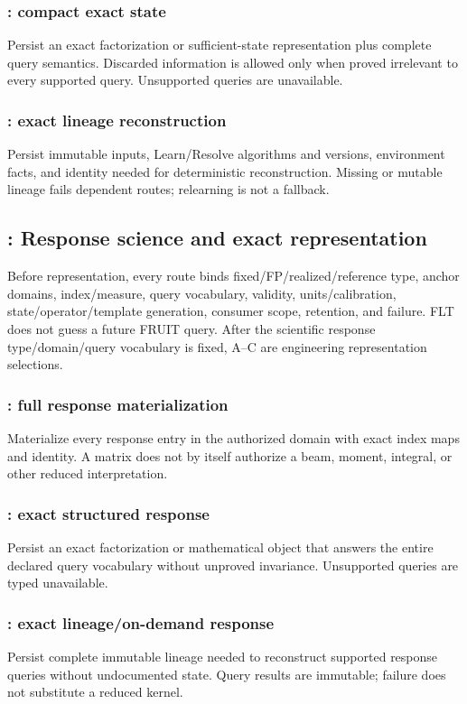 \subsubsection{: compact exact state}
Persist an exact factorization or sufficient-state representation plus complete
query semantics. Discarded information is allowed only when proved irrelevant
to every supported query. Unsupported queries are unavailable.

\subsubsection{: exact lineage reconstruction}
Persist immutable inputs, Learn/Resolve algorithms and versions, environment
facts, and identity needed for deterministic reconstruction. Missing or mutable
lineage fails dependent routes; relearning is not a fallback.

\subsection{: Response science and exact representation}

Before representation, every route binds fixed/FP/realized/reference type,
anchor domains, index/measure, query vocabulary, validity, units/calibration,
state/operator/template generation, consumer scope, retention, and failure.
FLT does not guess a future FRUIT query.
After the scientific response type/domain/query vocabulary is fixed, A--C are
engineering representation selections.

\subsubsection{: full response materialization}
Materialize every response entry in the authorized domain with exact index
maps and identity. A matrix does not by itself authorize a beam, moment,
integral, or other reduced interpretation.

\subsubsection{: exact structured response}
Persist an exact factorization or mathematical object that answers the entire
declared query vocabulary without unproved invariance. Unsupported queries are
typed unavailable.

\subsubsection{: exact lineage/on-demand response}
Persist complete immutable lineage needed to reconstruct supported response
queries without undocumented state. Query results are immutable; failure does
not substitute a reduced kernel.

